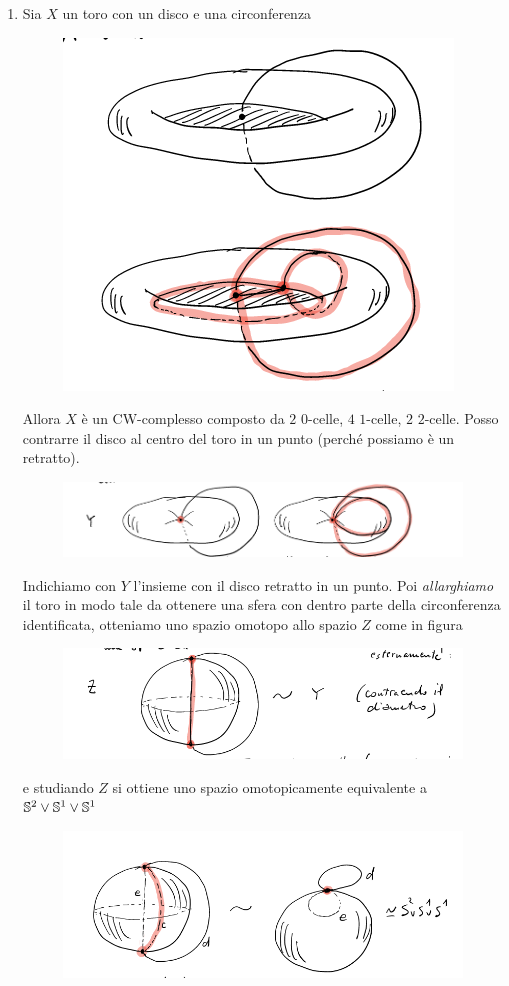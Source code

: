 \begin{remark}
\begin{enumerate}
\begin{figure}[H]
				\caption{}
				\label{fig:cwcomplexesempi4}
			\end{figure}
		\item Sia $X$ un toro con un disco e una circonferenza 
			\begin{figure}[H]
				\centering
				\includegraphics[width=0.3\linewidth]{images/topologia_algebrica/CWCOMPLEXEsempi4}
				\caption{}
				\label{fig:cwcomplexesempi4}
			\end{figure}
			Allora $X$ è un CW-complesso composto da $2$ $0$-celle, $4$ $1$-celle, $2$ $2$-celle. Posso contrarre il disco al centro del toro in un punto (perché possiamo è un retratto).   
			\begin{figure}[H]
				\centering
				\includegraphics[width=0.7\linewidth]{images/topologia_algebrica/CWCOMPLEXEsempi5}
				\caption{}
				\label{fig:cwcomplexesempi4}
			\end{figure}
			Indichiamo con $Y$ l'insieme con il disco retratto in un punto. Poi \textit{allarghiamo} il toro in modo tale da ottenere una sfera con dentro parte della circonferenza identificata, otteniamo uno spazio omotopo allo spazio $Z$ come in figura
			\begin{figure}[H]
				\centering
				\includegraphics[width=0.7\linewidth]{images/topologia_algebrica/CWCOMPLEXEsempi6}
				\caption{}
				\label{fig:cwcomplexesempi4}
			\end{figure}
			e studiando $Z$ si ottiene uno spazio omotopicamente equivalente a $\S^2 \lor \S^1 \lor \S^1$
			\begin{figure}[H]
				\centering
				\includegraphics[width=0.7\linewidth]{images/topologia_algebrica/CWCOMPLEXEsempi7}
				\caption{}
				\label{fig:cwcomplexesempi4}
			\end{figure}
	\end{enumerate}
\end{remark}

